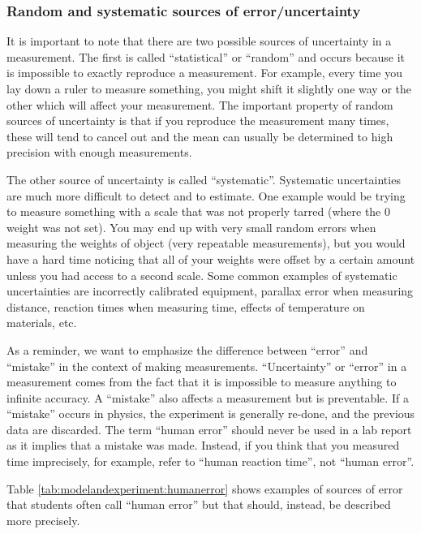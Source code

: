 \subsubsection{Random and systematic sources of error/uncertainty}
It is important to note that there are two possible sources of uncertainty in a measurement. The first is called ``statistical'' or ``random'' and occurs because it is impossible to exactly reproduce a measurement. For example, every time you lay down a ruler to measure something, you might shift it slightly one way or the other which will affect your measurement. The important property of random sources of uncertainty is that if you reproduce the measurement many times, these will tend to cancel out and the mean can usually be determined to high precision with enough measurements. 

The other source of uncertainty is called ``systematic''. Systematic uncertainties are much more difficult to detect and to estimate. One example would be trying to measure something with a scale that was not properly tarred (where the 0 weight was not set). You may end up with very small random errors when measuring the weights of object (very repeatable measurements), but you would have a hard time noticing that all of your weights were offset by a certain amount unless you had access to a second scale. Some common examples of systematic uncertainties are incorrectly calibrated equipment, parallax error when measuring distance, reaction times when measuring time, effects of temperature on materials, etc.

As a reminder, we want to emphasize the difference between ``error'' and ``mistake'' in the context of making measurements. ``Uncertainty'' or ``error'' in a measurement comes from the fact that it is impossible to measure anything to infinite accuracy. A ``mistake'' also affects a measurement but is preventable. If a ``mistake'' occurs in physics, the experiment is generally re-done, and the previous data are discarded. The term ``human error'' should never be used in a lab report as it implies that a mistake was made. Instead, if you think that you measured time imprecisely, for example, refer to ``human reaction time'', not ``human error''.

Table \ref{tab:modelandexperiment:humanerror} shows examples of sources of error that students often call ``human error'' but that should, instead, be described more precisely.

